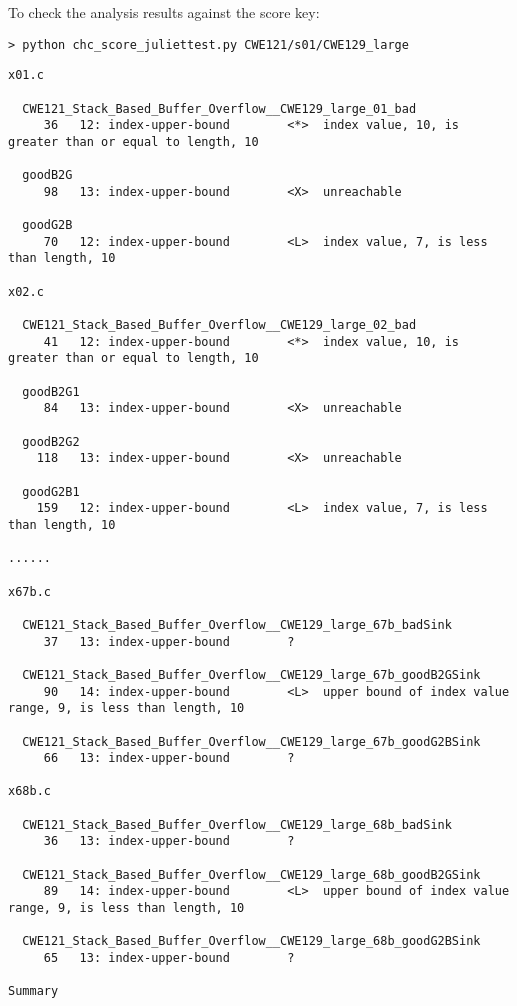 \documentclass[11pt]{article}
\begin{document}
To check the analysis results against the score key:
\begin{verbatim}
> python chc_score_juliettest.py CWE121/s01/CWE129_large
\end{verbatim}
\begin{scriptsize}
\begin{verbatim}
x01.c

  CWE121_Stack_Based_Buffer_Overflow__CWE129_large_01_bad
     36   12: index-upper-bound        <*>  index value, 10, is greater than or equal to length, 10

  goodB2G
     98   13: index-upper-bound        <X>  unreachable

  goodG2B
     70   12: index-upper-bound        <L>  index value, 7, is less than length, 10

x02.c

  CWE121_Stack_Based_Buffer_Overflow__CWE129_large_02_bad
     41   12: index-upper-bound        <*>  index value, 10, is greater than or equal to length, 10

  goodB2G1
     84   13: index-upper-bound        <X>  unreachable

  goodB2G2
    118   13: index-upper-bound        <X>  unreachable

  goodG2B1
    159   12: index-upper-bound        <L>  index value, 7, is less than length, 10

......

x67b.c

  CWE121_Stack_Based_Buffer_Overflow__CWE129_large_67b_badSink
     37   13: index-upper-bound        ?

  CWE121_Stack_Based_Buffer_Overflow__CWE129_large_67b_goodB2GSink
     90   14: index-upper-bound        <L>  upper bound of index value range, 9, is less than length, 10

  CWE121_Stack_Based_Buffer_Overflow__CWE129_large_67b_goodG2BSink
     66   13: index-upper-bound        ?

x68b.c

  CWE121_Stack_Based_Buffer_Overflow__CWE129_large_68b_badSink
     36   13: index-upper-bound        ?

  CWE121_Stack_Based_Buffer_Overflow__CWE129_large_68b_goodB2GSink
     89   14: index-upper-bound        <L>  upper bound of index value range, 9, is less than length, 10

  CWE121_Stack_Based_Buffer_Overflow__CWE129_large_68b_goodG2BSink
     65   13: index-upper-bound        ?

Summary


\end{verbatim}
\end{scriptsize}
\end{document}
